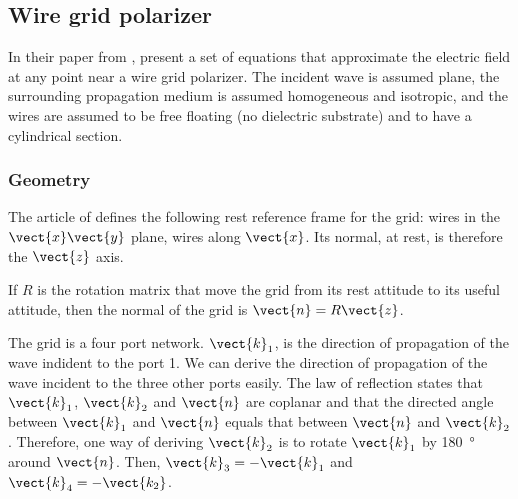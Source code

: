 \subsection{Wire grid polarizer}
In their paper from \citeyear{houde_2001} , \textcite{houde_2001} present a set of equations that approximate the electric field at any point near a wire grid polarizer.
The incident wave is assumed plane, the surrounding propagation medium is assumed homogeneous and isotropic, and the wires are assumed to be free floating (no dielectric substrate) and to have a cylindrical section.

\subsubsection{Geometry}
The article of \citeauthor{houde_2001} \cite{houde_2001} defines the following rest reference frame for the grid: wires in the $\vect{x}\vect{y}$ plane, wires along $\vect{x}$.
Its normal, at rest, is therefore the $\vect{z}$ axis.

If $R$ is the rotation matrix that move the grid from its rest attitude to its useful attitude, then the normal of the grid is $\vect{n}=R \vect{z}$.

The grid is a four port network.
$\vect{k}_1$,  is the direction of propagation of the wave indident to the port 1.
We can derive the direction of propagation of the wave incident to the three other ports easily.
The law of reflection states that $\vect{k}_1$, $\vect{k}_2$ and $\vect{n}$ are coplanar and that the directed angle between $\vect{k}_1$ and $\vect{n}$ equals that between $\vect{n}$ and $\vect{k}_2$.
Therefore, one way of deriving $\vect{k}_2$ is to rotate $\vect{k}_1$ by \SI{180}{\degree} around $\vect{n}$.
Then, $\vect{k}_3=-\vect{k}_1$ and $\vect{k}_4=-\vect{k_2}$.

